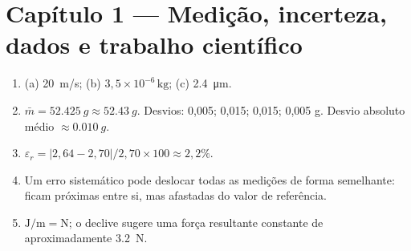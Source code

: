 \documentclass[11pt,a4paper,oneside]{book}
\begin{document}
\section*{Capítulo 1 — Medição, incerteza, dados e trabalho científico}
\begin{enumerate}
  \item (a) \SI{20}{m/s}; (b) $3{,}5\times10^{-6}\,\mathrm{kg}$; (c) \SI{2.4}{\micro m}.
  \item $\bar m=\SI{52.425}{g}\approx\SI{52.43}{g}$. Desvios: 0,005; 0,015; 0,015; 0,005 g. Desvio absoluto médio $\approx\SI{0.010}{g}$.
  \item $\varepsilon_r=|2{,}64-2{,}70|/2{,}70\times100\approx2{,}2\%$.
  \item Um erro sistemático pode deslocar todas as medições de forma semelhante: ficam próximas entre si, mas afastadas do valor de referência.
  \item $\mathrm{J/m}=\mathrm{N}$; o declive sugere uma força resultante constante de aproximadamente \SI{3.2}{N}.
\end{enumerate}
\end{document}
